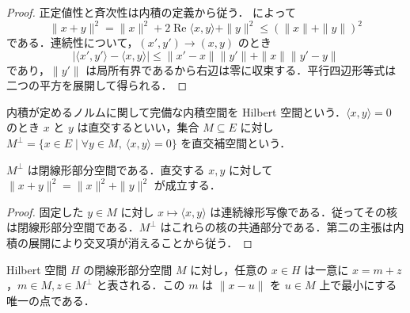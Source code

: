 \begin{proof}
正定値性と斉次性は内積の定義から従う． によって
\[
\|x+y\|^2=\|x\|^2+2\operatorname{Re}\langle x,y\rangle+\|y\|^2\leq(\|x\|+\|y\|)^2
\]
である．連続性について，$(x',y')\to(x,y)$ のとき
\[
|\langle x',y'\rangle-\langle x,y\rangle|\leq\|x'-x\|\|y'\|+\|x\|\|y'-y\|
\]
であり，$\|y'\|$ は局所有界であるから右辺は零に収束する．平行四辺形等式は二つの平方を展開して得られる．
\end{proof}
\begin{defn}[Hilbert空間と直交補空間]
内積が定めるノルムに関して完備な内積空間を Hilbert 空間という．$\langle x,y\rangle=0$ のとき $x$ と $y$ は直交するといい，集合 $M\subseteq E$ に対し $M^\perp=\{x\in E\mid\forall y\in M,\ \langle x,y\rangle=0\}$ を直交補空間という．
\end{defn}
\begin{prop}[直交補空間の閉性とPythagorasの等式]
$M^\perp$ は閉線形部分空間である．直交する $x,y$ に対して $\|x+y\|^2=\|x\|^2+\|y\|^2$ が成立する．
\end{prop}
\begin{proof}
固定した $y\in M$ に対し $x\mapsto\langle x,y\rangle$ は連続線形写像である．従ってその核は閉線形部分空間である．$M^\perp$ はこれらの核の共通部分である．第二の主張は内積の展開により交叉項が消えることから従う．
\end{proof}
\begin{prop}[閉部分空間への直交射影]
Hilbert 空間 $H$ の閉線形部分空間 $M$ に対し，任意の $x\in H$ は一意に $x=m+z$，$m\in M,z\in M^\perp$ と表される．この $m$ は $\|x-u\|$ を $u\in M$ 上で最小にする唯一の点である．
\end{prop}
